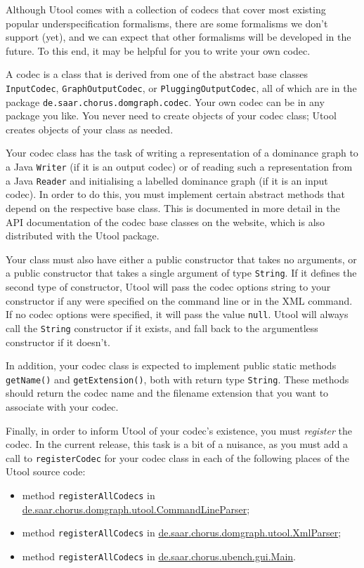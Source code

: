 Although Utool comes with a collection of codecs that cover most
existing popular underspecification formalisms, there are some
formalisms we don't support (yet), and we can expect that other
formalisms will be developed in the future. To this end, it may be
helpful for you to write your own codec.

A codec is a class that is derived from one of the abstract base
classes \verb?InputCodec?, \verb?GraphOutputCodec?, or
\verb?PluggingOutputCodec?, all of which are in the package
\verb?de.saar.chorus.domgraph.codec?. Your own codec can be in any
package you like. You never need to create objects of your codec
class; Utool creates objects of your class as needed.

Your codec class has the task of writing a representation of a
dominance graph to a Java \verb?Writer? (if it is an output codec) or
of reading such a representation from a Java \verb?Reader? and
initialising a labelled dominance graph (if it is an input codec). In
order to do this, you must implement certain abstract methods that
depend on the respective base class. This is documented in more detail
in the API documentation of the codec base classes on the website,
which is also distributed with the Utool package.

Your class must also have either a public constructor that takes no
arguments, or a public constructor that takes a single argument of
type \verb?String?. If it defines the second type of constructor,
Utool will pass the codec options string to your constructor if any
were specified on the command line or in the XML command. If no codec
options were specified, it will pass the value \verb?null?. Utool will
always call the \verb?String? constructor if it exists, and fall back
to the argumentless constructor if it doesn't.

In addition, your codec class is expected to implement public static
methods \verb?getName()? and \verb?getExtension()?, both with return
type \verb?String?. These methods should return the codec name and the
filename extension that you want to associate with your codec.

Finally, in order to inform Utool of your codec's existence, you must
\emph{register} the codec. In the current release, this task is a bit
of a nuisance, as you must add a call to \verb?registerCodec? for your
codec class in each of the following places of the Utool source code:
\begin{itemize}
\item method \verb?registerAllCodecs? in
  \url{de.saar.chorus.domgraph.utool.CommandLineParser};
\item method \verb?registerAllCodecs? in
  \url{de.saar.chorus.domgraph.utool.XmlParser};
\item method \verb?registerAllCodecs? in
  \url{de.saar.chorus.ubench.gui.Main}. 
\end{itemize}


